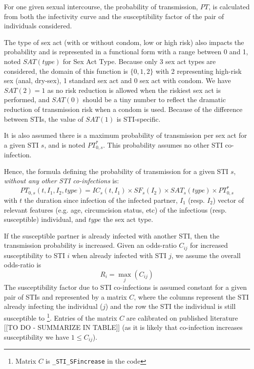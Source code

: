 \documentclass[11pt, onecolumn]{article}
\newcommand{\ttt}[1]{\texttt{#1}}
\begin{document}
For one given sexual intercourse, the probability of transmission, $PT$, is calculated from both the infectivity curve and the susceptibility factor of the pair of individuals considered. 

The type of sex act (with or without condom, low or high risk) also impacts the probability and is represented in a functional form with a range between 0 and 1, noted $SAT(type)$ for Sex Act Type. Because only 3 sex act types are considered, the domain of this function is $\{0,1,2\}$ with 2 representing high-risk sex (anal, dry-sex), 1 standard sex act and 0 sex act with condom. We have $SAT(2)=1$ as no risk reduction is allowed when the riskiest sex act is performed, and $SAT(0)$ should be a tiny number to reflect the dramatic reduction of transmission risk when a condom is used. Because of the difference between STIs, the value of $SAT(1)$ is STI-specific.

It is also assumed there is a maximum probability of transmission per sex act for a given STI $s$, and is noted $PT_{0,s}^*$. This probability assumes no other STI co-infection. 

Hence, the formula defining the probability of transmission for a given STI $s$, \emph{without any other STI co-infections} is:
$$PT_{0,s}(t,I_1,I_2,type) =  IC_s(t,I_1)\times SF_s(I_2) \times SAT_s(type) \times PT_{0,s}^* $$
with $t$ the duration since infection of the infected partner, $I_1$ (resp. $I_2$) vector of relevant features (e.g. age, circumcision status, etc) of the infectious (resp. susceptible) individual, and $type$ the sex act type.

If the susceptible partner is already infected with another STI, then the transmission probability is increased. Given an odds-ratio $C_{ij}$ for increased susceptibility to STI $i$ when already infected with STI $j$, we assume the overall odds-ratio is
$$R_i = \max_j(C_{ij})$$
The susceptibility factor due to STI co-infections is assumed constant for a given pair of STIs and represented by a matrix $C$, where the columns represent the STI already infecting the individual ($j$) and the row the STI the individual is still susceptible to
\footnote{Matrix $C$ is \ttt{\_STI\_SFincrease} in the code}. 
Entries of the matrix $C$ are calibrated on published literature [[TO DO - SUMMARIZE IN TABLE]] (as it is likely that co-infection increases susceptibility we have $1\leq C_{ij}$). 
\end{document}
